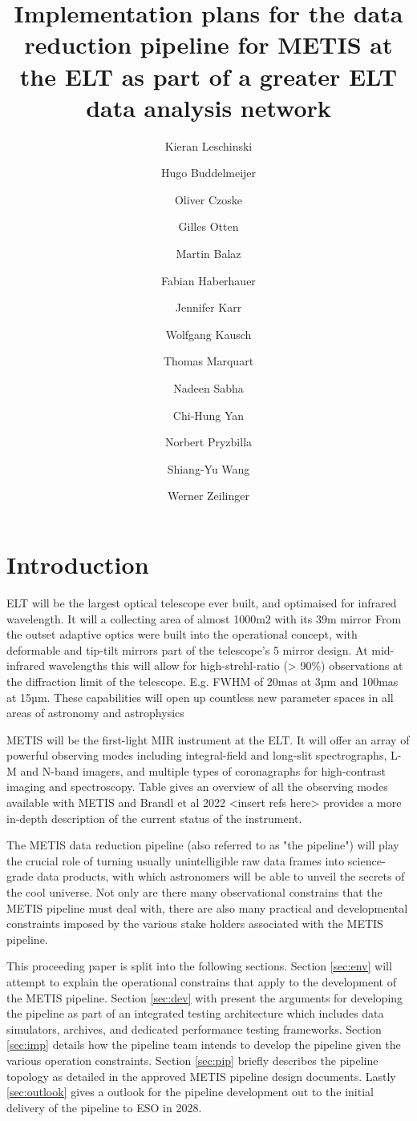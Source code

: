\documentclass[a4paper]{spie}  %
\title{Implementation plans for the data reduction pipeline for METIS at the ELT as part of a greater ELT data analysis network}
\author[a]{Kieran Leschinski}
\author[a]{Hugo Buddelmeijer}
\author[a]{Oliver Czoske}
\author[b]{Gilles Otten}
\author[a]{Martin Balaz}
\author[a]{Fabian Haberhauer}
\author[b]{Jennifer Karr}
\author[c]{Wolfgang Kausch}
\author[d]{Thomas Marquart}
\author[c]{Nadeen Sabha}
\author[b]{Chi-Hung Yan}
\author[c]{Norbert Pryzbilla}
\author[b]{Shiang-Yu Wang}
\author[a]{Werner Zeilinger}
\affil[a]{University of Vienna, T\"urkenschanztra\ss e 18, 1180 Vienna, Austria}
\affil[a]{University of Vienna, T\"urkenschanztra\ss e 18, 1180 Vienna, Austria}
\affil[a]{University of Vienna, T\"urkenschanztra\ss e 18, 1180 Vienna, Austria}
\affil[a]{University of Vienna, T\"urkenschanztra\ss e 18, 1180 Vienna, Austria}
\begin{document}
 
\maketitle

\begin{abstract}


\end{abstract}



\section{Introduction}
ELT will be the largest optical telescope ever built, and optimaised for infrared wavelength.
It will a collecting area of almost 1000m2 with its 39m mirror 
From the outset adaptive optics were built into the operational concept, with deformable and tip-tilt mirrors part of the telescope's 5 mirror design.
At mid-infrared wavelengths this will allow for high-strehl-ratio (> 90\%) observations at the diffraction limit of the telescope. 
E.g. FWHM of 20mas at 3µm and 100mas at 15µm.
These capabilities will open up countless new parameter spaces in all areas of astronomy and astrophysics


METIS will be the first-light MIR instrument at the ELT.
It will offer  an array of powerful observing modes including  integral-field and long-slit spectrographs, L-M and N-band imagers, and multiple types of coronagraphs for high-contrast imaging and spectroscopy.
Table gives an overview of all the observing modes available with METIS and Brandl et al 2022 <insert refs here> provides a more in-depth description of the current status of the instrument. 

The METIS data reduction pipeline (also referred to as  "the pipeline") will play the crucial role of turning usually unintelligible raw data frames into science-grade data products, with which astronomers will be able to unveil the secrets of the cool universe.
Not only are there many observational constrains that the METIS pipeline must deal with, there are also many practical and developmental constraints imposed by the various stake holders associated with the METIS pipeline.

This proceeding paper is split into the following sections. Section \ref{sec:env} will attempt to explain the operational constrains that apply to the development of the METIS pipeline. Section \ref{sec:dev} with present the arguments for developing the pipeline as part of an integrated testing architecture which includes data simulators, archives, and dedicated performance testing frameworks. Section \ref{sec:imp} details how the pipeline team intends to develop the pipeline given the various operation constraints. Section \ref{sec:pip} briefly describes the pipeline topology as detailed in the approved METIS pipeline design documents. Lastly \ref{sec:outlook} gives a outlook for the pipeline development out to the initial delivery of the pipeline to ESO in 2028.
\end{document}

